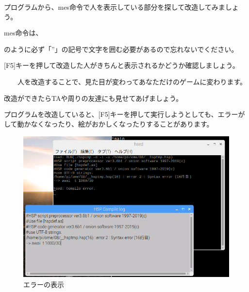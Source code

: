 プログラムから、mes命令で人を表示している部分を探して改造してみましょう。

mes命令は、

\begin{description}
    \item {}
\end{description}


のように必ず「”」の記号で文字を囲む必要があるので忘れないでください。

\begin{description}
    \item {}
\end{description}


[F5]キーを押して改造した人がきちんと表示されるかどうか確認しましょう。

\ \ \ \ 人を改造することで、見た目が変わってあなただけのゲームに変わります。

改造ができたらTAや周りの友達にも見せてあげましょう。

\clearpage

\begin{description}
    \item {}
\end{description}

プログラムを改造していると、[F5]キーを押して実行しようとしても、エラーがして動かなくなったり、絵がおかしくなったりすることがあります。


\begin{figure}[H]
    \begin{center}
      \includegraphics[keepaspectratio,width=11.324cm,height=7.756cm]{text04-img/s_hsperror.png}
      \caption{エラーの表示}
    \end{center}
    \label{fig:prog_menu}
\end{figure}

